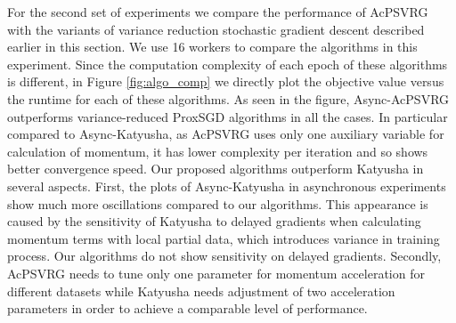 For the second set of experiments we compare the performance of AcPSVRG with the variants of variance reduction stochastic gradient descent described earlier in this section.  
We use 16 workers to compare the algorithms in this experiment. Since the computation complexity of each epoch of these
algorithms is different, in Figure \ref{fig:algo_comp} we directly plot the objective value versus the runtime for each of these algorithms. 
As seen in the figure, Async-AcPSVRG outperforms variance-reduced ProxSGD algorithms in all the cases. In particular compared to Async-Katyusha, as AcPSVRG uses only one auxiliary variable for calculation of momentum, it has lower complexity per iteration and so shows better convergence speed. 
Our proposed algorithms outperform Katyusha in several aspects. First, the plots of Async-Katyusha in asynchronous experiments show much more oscillations compared to our algorithms. This appearance
is caused by the sensitivity of Katyusha  to delayed gradients when calculating momentum terms with local partial data, which introduces variance in training process. Our algorithms do not show sensitivity on delayed gradients. Secondly, AcPSVRG needs to tune only one parameter for momentum acceleration for different datasets while Katyusha needs adjustment of two acceleration parameters in order to achieve a comparable level of performance.

